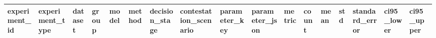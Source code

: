 \begin{tabular}{lllllllllllllllll}
\toprule
experiment\_id & experiment\_type & dataset & group & model & method & decision\_stage & contestation\_scenario & parameter\_key & parameter\_json & metric & count & mean & std & standard\_error & ci95\_lower & ci95\_upper \\
\midrule
\bottomrule
\end{tabular}
